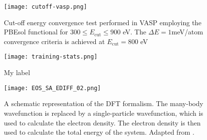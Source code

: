 \begin{figure}[h]
    \centering
    \texttt{[image: cutoff-vasp.png]}
    \caption{
    Cut-off energy convergence test performed in VASP employing the PBEsol functional for $300 \leq E_{\text{cut}} \leq 900$ eV. The $\Delta E = 1$meV/atom convergence criteria is achieved at $E_{\text {cut}} = 800$ eV}
    \label{cutoff-energy}
\end{figure}



\begin{figure}[h]
    \centering
    \texttt{[image: training-stats.png]}
    \caption{
    My label
    }
    \label{training-stats}
\end{figure}

\begin{figure}[h]
    \centering
    \texttt{[image: EOS\_SA\_EDIFF\_02.png]}
    \caption{A schematic representation of the DFT formalism. The many-body wavefunction is replaced by a single-particle wavefunction, which is used to calculate the electron density. The electron density is then used to calculate the total energy of the system. Adapted from \supercite{giustino2014materials}.}
    \label{fig:dft}
\end{figure}
